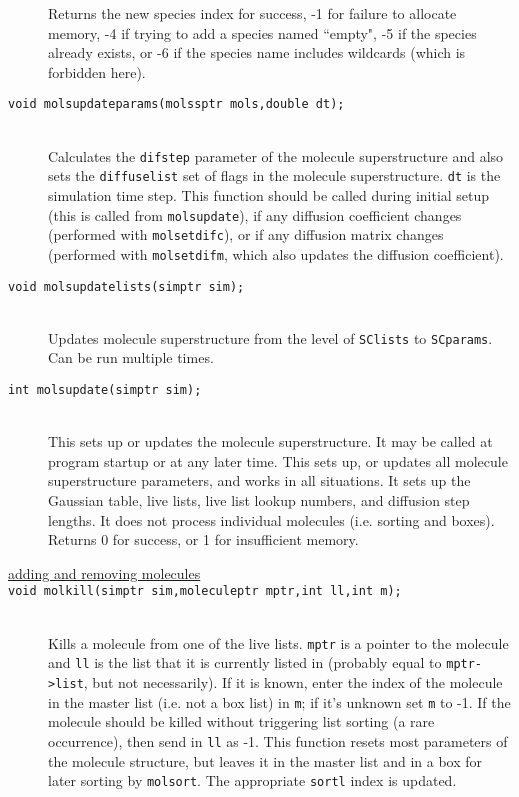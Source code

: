 \documentclass {scrbook}
\newcommand {\ttt} {\texttt}
\begin{document}
\begin{description}
Returns the new species index for success, -1 for failure to allocate memory, -4 if trying to add a species named ``empty", -5 if the species already exists, or -6 if the species name includes wildcards (which is forbidden here).

\item[\ttt{void molsupdateparams(molssptr mols,double dt);}]
\hfill \\
Calculates the \ttt{difstep} parameter of the molecule superstructure and also sets the \ttt{diffuselist} set of flags in the molecule superstructure. \ttt{dt} is the simulation time step. This function should be called during initial setup (this is called from \ttt{molsupdate}), if any diffusion coefficient changes (performed with \ttt{molsetdifc}), or if any diffusion matrix changes (performed with \ttt{molsetdifm}, which also updates the diffusion coefficient).

\item[\ttt{void molsupdatelists(simptr sim);}]
\hfill \\
Updates molecule superstructure from the level of \ttt{SClists} to \ttt{SCparams}. Can be run multiple times.

\item[\ttt{int molsupdate(simptr sim);}]
\hfill \\
This sets up or updates the molecule superstructure. It may be called at program startup or at any later time. This sets up, or updates all molecule superstructure parameters, and works in all situations. It sets up the Gaussian table, live lists, live list lookup numbers, and diffusion step lengths. It does not process individual molecules (i.e. sorting and boxes). Returns 0 for success, or 1 for insufficient memory.

\item[\underline{adding and removing molecules}]

\item[\ttt{void molkill(simptr sim,moleculeptr mptr,int ll,int m);}]
\hfill \\
Kills a molecule from one of the live lists. \ttt{mptr} is a pointer to the molecule and \ttt{ll} is the list that it is currently listed in (probably equal to \ttt{mptr->list}, but not necessarily). If it is known, enter the index of the molecule in the master list (i.e. not a box list) in \ttt{m}; if it's unknown set \ttt{m} to -1. If the molecule should be killed without triggering list sorting (a rare occurrence), then send in \ttt{ll} as -1. This function resets most parameters of the molecule structure, but leaves it in the master list and in a box for later sorting by \ttt{molsort}. The appropriate \ttt{sortl} index is updated.


\end{description}
\end{document}
